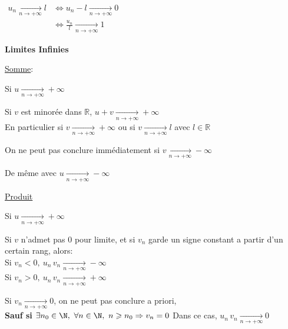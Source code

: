 \documentclass[12pt,twoside,a4paper]{article}
\begin{document}
		\begin{coro}
			$\begin{aligned}u_n\mathop{\longrightarrow}\limits_{n\rightarrow+\infty}l&\iff u_n-l\mathop{\longrightarrow}\limits_{n\rightarrow+\infty}0\\
				&\iff \frac{u_n}{l}\mathop{\longrightarrow}\limits_{n\rightarrow+\infty}1\end{aligned}$
		\end{coro}
		\begin{flushleft}
			\textbf{Limites Infinies}
		\end{flushleft}
		\begin{prop}
			\underline{Somme}:
			\begin{liste}
				\item Si $u\mathop{\longrightarrow}\limits_{n\rightarrow+\infty}+\infty$
				\begin{liste}
					\item Si $v$ est minorée dans $\mathbb{R}$, $u+v\mathop{\longrightarrow}\limits_{n\rightarrow+\infty}+\infty$\\
						En particulier si $v\mathop{\longrightarrow}\limits_{n\rightarrow+\infty}+\infty$ ou si $v\mathop{\longrightarrow}\limits_{n\rightarrow+\infty}l$ avec $l\in\mathbb{R}$
					\item On ne peut pas conclure immédiatement si $v\mathop{\longrightarrow}\limits_{n\rightarrow+\infty}-\infty$
				\end{liste}
				\item De m\^eme avec $u\mathop{\longrightarrow}\limits_{n\rightarrow+\infty}-\infty$
			\end{liste}
			\underline{Produit}
			\begin{liste}
				\item Si $u\mathop{\longrightarrow}\limits_{n\rightarrow+\infty}+\infty$
				\begin{liste}
					\item Si $v$ n'admet pas $0$ pour limite, et si $v_n$ garde un signe constant a partir d'un certain rang, alors:\\
						Si $v_n<0,\ u_n\,v_n\mathop{\longrightarrow}\limits_{n\rightarrow+\infty}-\infty$\\
						Si $v_n>0,\ u_n\,v_n\mathop{\longrightarrow}\limits_{n\rightarrow+\infty}+\infty$
					\item Si $v_n\mathop{\longrightarrow}\limits_{n\rightarrow+\infty}0$, on ne peut pas conclure a priori,\\
					\textbf{Sauf si} $\exists n_0\in\N,\ \forall n\in\N,\ n\geqslant n_0\Rightarrow v_n=0$ Dans ce cas, $u_n\,v_n\mathop{\longrightarrow}\limits_{n\rightarrow+\infty}0$

\end{liste}
\end{liste}
\end{prop}
\end{document}
